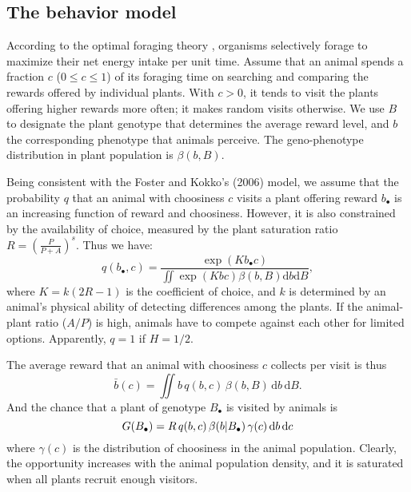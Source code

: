 \documentclass[12pt]{article}
\begin{document}
\subsection*{The behavior model}

According to the optimal foraging theory \citep{MacArthur1966, Stephens1987}, organisms selectively forage to maximize their net energy intake per unit time. Assume that an animal spends a fraction $c$ ($0 \leq c \leq 1$) of its foraging time on searching and comparing the rewards offered by individual plants. With $c>0$, it tends to visit the plants offering higher rewards more often; it makes random visits otherwise. We use $B$ to designate the plant genotype that determines the average reward level, and $b$ the corresponding phenotype that animals perceive. The geno-phenotype distribution in plant population is $\beta(b,B)$. 

Being consistent with the Foster and Kokko's (2006) model, we assume that the probability $q$ that an animal with choosiness $c$ visits a plant offering reward $b_\bullet$ is an increasing function of reward and choosiness. However, it is also constrained by the availability of choice, measured by the plant saturation ratio $R=(\tfrac{P}{P+ A})^s$. Thus we have:
\begin{equation}
q(b_\bullet,c)=\frac{\exp \left( K b_\bullet c \right)}{\iint \exp \left( K b c \right) \beta(b,B) \mathrm{d}b \mathrm{d}B},
\label{eq:bias}
\end{equation}
where $K = k (2 R-1)$ is the coefficient of choice, and $k$ is determined by an animal's physical ability of detecting differences among the plants. If the animal-plant ratio ($A/P$) is high, animals have to compete against each other for limited options. Apparently, $q = 1$ if $H=1/2$.

The average reward that an animal with choosiness $c$ collects per visit is thus
\begin{equation}
\bar{b}(c) = \iint b \, q(b, c) \, \beta(b,B) \, \mathrm{d} b\, \mathrm{d}B.
\label{eq:chosen_reward}
\end{equation}
And the chance that a plant of genotype $B_\bullet$ is visited by animals is 
\begin{equation}
G(B_\bullet)= R \, q(b,c)\, \beta(b|B_\bullet)\, \gamma(c)\, \mathrm{d}b \, \mathrm{d}c \nonumber \\ 
\label{eq:G}
\end{equation}
where $\gamma(c)$ is the distribution of choosiness in the animal population. Clearly, the opportunity increases with the animal population density, and it is saturated when all plants recruit enough visitors.
\end{document}
